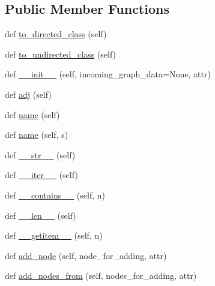 \subsection*{Public Member Functions}
\begin{DoxyCompactItemize}
\item 
def \hyperlink{classnetworkx_1_1classes_1_1graph_1_1Graph_a1256a01c9fcf2ec6e7ad99cd4dd5ce7a}{to\+\_\+directed\+\_\+class} (self)
\item 
def \hyperlink{classnetworkx_1_1classes_1_1graph_1_1Graph_a38391a01e0e114d42dc0c89d159b79b4}{to\+\_\+undirected\+\_\+class} (self)
\item 
def \hyperlink{classnetworkx_1_1classes_1_1graph_1_1Graph_ab11a4fd91f4b19fc5d8975a009983e5a}{\+\_\+\+\_\+init\+\_\+\+\_\+} (self, incoming\+\_\+graph\+\_\+data=None, attr)
\item 
def \hyperlink{classnetworkx_1_1classes_1_1graph_1_1Graph_a350941a0803b7249b9ea692daa4d0b58}{adj} (self)
\item 
def \hyperlink{classnetworkx_1_1classes_1_1graph_1_1Graph_a8dd1e8272154babfd15aff6876d0f8f4}{name} (self)
\item 
def \hyperlink{classnetworkx_1_1classes_1_1graph_1_1Graph_a11a4ef26bf3776a7d6b90187b5d710ea}{name} (self, s)
\item 
def \hyperlink{classnetworkx_1_1classes_1_1graph_1_1Graph_a0729f1d954c500b397108089589c106b}{\+\_\+\+\_\+str\+\_\+\+\_\+} (self)
\item 
def \hyperlink{classnetworkx_1_1classes_1_1graph_1_1Graph_a111aa635ef36c13b4cb26320fb58435b}{\+\_\+\+\_\+iter\+\_\+\+\_\+} (self)
\item 
def \hyperlink{classnetworkx_1_1classes_1_1graph_1_1Graph_a76f2c139757b86ef934690b4a0859388}{\+\_\+\+\_\+contains\+\_\+\+\_\+} (self, n)
\item 
def \hyperlink{classnetworkx_1_1classes_1_1graph_1_1Graph_a78ea8d70a57f629e27064654718d8229}{\+\_\+\+\_\+len\+\_\+\+\_\+} (self)
\item 
def \hyperlink{classnetworkx_1_1classes_1_1graph_1_1Graph_a6bcf0a13d8dd2d2b10ad7e17e042cd1c}{\+\_\+\+\_\+getitem\+\_\+\+\_\+} (self, n)
\item 
def \hyperlink{classnetworkx_1_1classes_1_1graph_1_1Graph_a5cc3c4d817d7cbce358623f3e03fe22e}{add\+\_\+node} (self, node\+\_\+for\+\_\+adding, attr)
\item 
def \hyperlink{classnetworkx_1_1classes_1_1graph_1_1Graph_ac1237b79b60793c0c4d342160e439163}{add\+\_\+nodes\+\_\+from} (self, nodes\+\_\+for\+\_\+adding, attr)
\item 

\end{DoxyCompactItemize}
